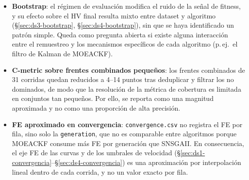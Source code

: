 \begin{itemize}
        C++ difieren en más que el modelo de neurona, ya que también difieren en la
        implementación y en el generador de números aleatorios; al no existir columna de seed en
        los datos de MATLAB, no hay forma de aislar esa diferencia. Por ello, los resultados de
        \S\ref{sec:ds1-plataforma}--\S\ref{sec:ds4-plataforma} deben leerse como evidencia
        direccional (la ANN supera consistentemente a la SNN), y no como una atribución causal
        limpia al hecho de ser spiking.
  \item \textbf{Bootstrap}: el régimen de evaluación modifica el ruido de la señal de fitness, y
        su efecto sobre el HV final resulta mixto entre dataset y algoritmo
        (\S\ref{sec:ds3-bootstrap}, \S\ref{sec:ds4-bootstrap}), sin que se haya identificado un
        patrón simple. Queda como pregunta abierta si existe alguna interacción entre el
        remuestreo y los mecanismos específicos de cada algoritmo (p.\,ej.\ el filtro de Kalman
        de MOEACKF).
  \item \textbf{C-metric sobre frentes combinados pequeños}: los frentes combinados de 31
        corridas quedan reducidos a 4--14 puntos tras deduplicar y filtrar los no dominados, de
        modo que la resolución de la métrica de cobertura es limitada en conjuntos tan pequeños.
        Por ello, se reporta como una magnitud aproximada y no como una proporción de alta
        precisión.
  \item \textbf{FE aproximado en convergencia}: \texttt{convergence.csv} no registra el FE por
        fila, sino solo la \texttt{generation}, que no es comparable entre algoritmos porque
        MOEACKF consume más FE por generación que SNSGAII. En consecuencia, el eje FE de las
        curvas y de los umbrales de velocidad
        (\S\ref{sec:ds1-convergencia}--\S\ref{sec:ds4-convergencia}) es una aproximación por
        interpolación lineal dentro de cada corrida, y no un valor exacto por fila.
\end{itemize}
